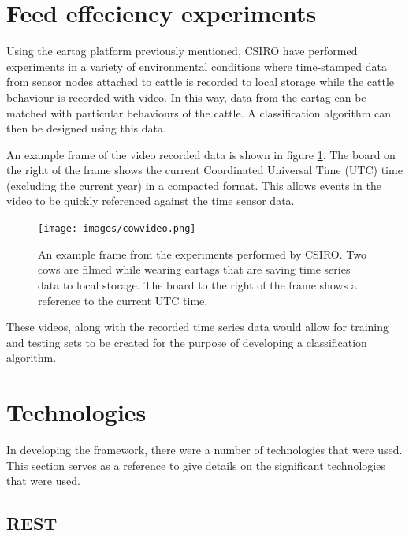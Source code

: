 \section{Feed effeciency experiments}
\label{feedef}
Using the eartag platform previously mentioned, CSIRO have performed experiments in a variety of environmental conditions where time-stamped data from sensor nodes attached to cattle is recorded to local storage while the cattle behaviour is recorded with video. In this way, data from the eartag can be matched with particular behaviours of the cattle. A classification algorithm can then be designed using this data.

An example frame of the video recorded data is shown in figure \ref{cowvideo}. The board on the right of the frame shows the current Coordinated Universal Time (UTC) time (excluding the current year) in a compacted format. This allows events in the video to be quickly referenced against the time sensor data.

\begin{figure}[ht!]
\begin{center}
\leavevmode
\texttt{[image: images/cowvideo.png]}
\end{center}
\caption[Frame of cattle video]{An example frame from the experiments performed by CSIRO. Two cows are filmed while wearing eartags that are saving time series data to local storage. The board to the right of the frame shows a reference to the current UTC time.}
\label{cowvideo}
\end{figure}

These videos, along with the recorded time series data would allow for training and testing sets to be created for the purpose of developing a classification algorithm.

\section{Technologies}

In developing the framework, there were a number of technologies that were used. This section serves as a reference to give details on the significant technologies that were used. 

\subsection{REST}


